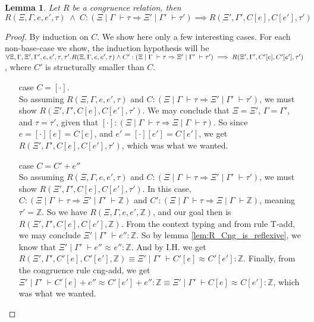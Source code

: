 \documentclass[twoside,11pt,openright]{report}
\newtheorem{lemma}[theorem]{Lemma}
\theoremstyle{definition}
\newcommand{\expr}{e}
\newcommand{\empctx}{[\cdot]}
\newcommand{\ctx}{C}
\newcommand{\Tint}{\mathbb{Z}}
\newcommand{\typ}{\tau}
\newcommand{\venv}{\Gamma}
\newcommand{\tenv}{\Xi}
\newcommand{\jdg}[4]{#1 \; | \; #2 \; \vdash #3 : #4}
\newcommand{\jdgType}[3]{#1 \; | \; #2 \; \vdash #3}
\newcommand{\jdgRel}[6]{#1 \; | \; #2 \; \vdash #3 \approx^{#4} #5 : #6}
\begin{document}
\begin{lemma}\label{lem:CE_eq_part2_helper}
  Let $R$ be a congruence relation, then $R(\tenv, \venv, \expr, \expr', \typ) \; \land \; \ctx:(\jdgType{\tenv}{\venv}{\typ} \Rightarrow \jdgType{\tenv'}{\venv'}{\typ'}) \implies R(\tenv', \venv', C[\expr], C[\expr'], \typ')$
\end{lemma}
\begin{proof}
  By induction on $\ctx$. We show here only a few interesting cases.
  For each non-base-case we show, the induction hypothesis will be $\forall \tenv, \venv, \tenv', \venv', \expr, \expr', \typ, \typ' .\\ R(\tenv, \venv, \expr, \expr', \typ) \land \ctx' : (\jdgType{\tenv}{\venv}{\typ} \Rightarrow \jdgType{\tenv'}{\venv'}{\typ'}) \implies R(\tenv', \venv', \ctx'[\expr], \ctx'[\expr'], \typ')$, where $\ctx'$ is structurally smaller than $\ctx$.
  \begin{itemize}
    \item[case] $\ctx = \empctx$.\\
      So assuming $R(\tenv, \venv, \expr, \expr', \typ)$ and $\ctx: (\jdgType{\tenv}{\venv}{\typ} \Rightarrow \jdgType{\tenv'}{\venv'}{\typ'})$, we must show $R(\tenv', \venv', \ctx[\expr], \ctx[\expr'], \typ')$. We may conclude that $\tenv = \tenv'$, $\venv = \venv'$, and $\typ = \typ'$, given that $\empctx : (\jdgType{\tenv}{\venv}{\typ} \Rightarrow \jdgType{\tenv}{\venv}{\typ})$. So since $\expr = \empctx[\expr] = \ctx[\expr]$, and $\expr' = \empctx[\expr'] = \ctx[\expr']$, we get $R(\tenv', \venv', \ctx[\expr], \ctx[\expr'], \typ')$, which was what we wanted.
    \item[case] $\ctx = \ctx' + \expr''$\\
      So assuming $R(\tenv, \venv, \expr, \expr', \typ)$ and $\ctx : (\jdgType{\tenv}{\venv}{\typ} \Rightarrow \jdgType{\tenv'}{\venv'}{\typ'})$, we must show $R(\tenv', \venv', \ctx[\expr], \ctx[\expr'], \typ')$. In this case, $\ctx : (\jdgType{\tenv}{\venv}{\typ} \Rightarrow \jdgType{\tenv'}{\venv'}{\Tint})$ and $\ctx' : (\jdgType{\tenv}{\venv}{\typ} \Rightarrow \jdgType{\tenv}{\venv}{\Tint})$, meaning $\typ' = \Tint$. So we have $R(\tenv, \venv, \expr, \expr', \Tint)$, and our goal then is $R(\tenv', \venv', \ctx[\expr], \ctx[\expr'], \Tint)$. From the context typing and from rule T-add, we may conclude $\jdg{\tenv'}{\venv'}{\expr''}{\Tint}$. So by lemma \ref{lem:R_Cng_is_reflexive}, we know that $\jdgRel{\tenv'}{\venv'}{\expr''}{}{\expr''}{\Tint}$. And by I.H. we get $R(\tenv', \venv', \ctx'[\expr], \ctx'[\expr'], \Tint) \equiv \jdgRel{\tenv'}{\venv'}{\ctx'[\expr]}{}{\ctx'[\expr']}{\Tint}$. Finally, from the congruence rule cng-add, we get $\jdgRel{\tenv'}{\venv'}{\ctx'[\expr] + \expr''}{}{\ctx'[\expr'] + \expr''}{\Tint} \equiv \jdgRel{\tenv'}{\venv'}{\ctx[\expr]}{}{\ctx[\expr']}{\Tint}$, which was what we wanted.

\end{itemize}
\end{proof}
\end{document}
